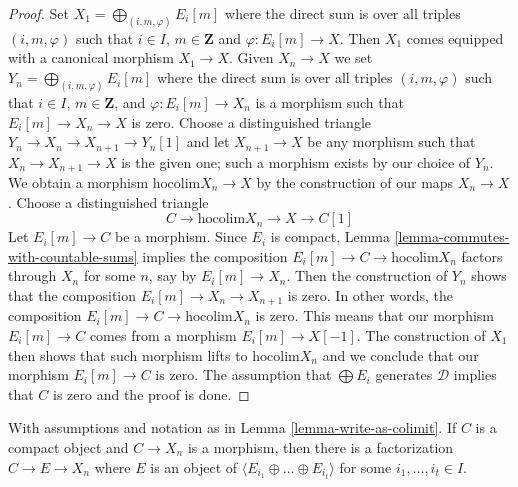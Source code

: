 \begin{proof}
Set $X_1 = \bigoplus_{(i, m, \varphi)} E_i[m]$ where the direct sum is over
all triples $(i, m, \varphi)$ such that $i \in I$, $m \in \mathbf{Z}$
and $\varphi : E_i[m] \to X$. Then $X_1$ comes equipped with a canonical
morphism $X_1 \to X$. Given $X_n \to X$ we set
$Y_n = \bigoplus_{(i, m, \varphi)} E_i[m]$ where the direct sum is over
all triples $(i, m, \varphi)$ such that $i \in I$, $m \in \mathbf{Z}$, and
$\varphi : E_i[m] \to X_n$ is a morphism such that $E_i[m] \to X_n \to X$
is zero. Choose a distinguished triangle
$Y_n \to X_n \to X_{n + 1} \to Y_n[1]$
and let $X_{n + 1} \to X$ be any morphism such that $X_n \to X_{n + 1} \to X$
is the given one; such a morphism exists by our choice of $Y_n$.
We obtain a morphism $\text{hocolim} X_n \to X$ by the construction
of our maps $X_n \to X$. Choose a distinguished triangle
$$
C \to \text{hocolim} X_n \to X \to C[1]
$$
Let $E_i[m] \to C$ be a morphism. Since $E_i$ is compact,
Lemma \ref{lemma-commutes-with-countable-sums}
implies the composition $E_i[m] \to C \to \text{hocolim} X_n$ factors through
$X_n$ for some $n$, say by $E_i[m] \to X_n$. Then the
construction of $Y_n$ shows that the composition
$E_i[m] \to X_n \to X_{n + 1}$ is zero. In other words, the composition
$E_i[m] \to C \to \text{hocolim} X_n$ is zero. This means that our
morphism $E_i[m] \to C$ comes from a morphism $E_i[m] \to X[-1]$.
The construction of $X_1$ then shows that such morphism lifts to
$\text{hocolim} X_n$ and we conclude that our morphism $E_i[m] \to C$
is zero. The assumption that $\bigoplus E_i$ generates $\mathcal{D}$
implies that $C$ is zero and the proof is done.
\end{proof}

\begin{lemma}
\label{lemma-factor-through}
With assumptions and notation as in Lemma \ref{lemma-write-as-colimit}.
If $C$ is a compact object and $C \to X_n$ is a morphism, then
there is a factorization $C \to E \to X_n$ where
$E$ is an object of $\langle E_{i_1} \oplus \ldots \oplus E_{i_t} \rangle$
for some $i_1, \ldots, i_t \in I$.
\end{lemma}


